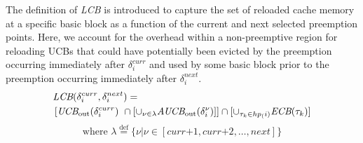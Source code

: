 The definition of \textit{LCB} is introduced to capture the set of reloaded cache memory at a specific basic block as a function of the current and next selected preemption points.  Here, we account for the overhead within a non-preemptive region for reloading UCBs that could have potentially been evicted by the preemption occurring immediately after $\delta_i^{curr}$ and used by some basic block prior to the preemption occurring immediately after $\delta_i^{next}$.
\begin{equation}\label{eqn:lcb-formula-1}
\begin{split}
    \lefteqn{\textit{LCB}(\delta_{i}^{curr},\delta_{i}^{next}) =} & \\
    &\left[\textit{UCB}_{\textrm{out}}(\delta_{i}^{curr})\ \cap \left[\cup_{\nu \in \lambda} \textit{AUCB}_{\textrm{out}}(\delta_{i}^{\nu})\right]\right] \cap [\cup_{\tau_{k}\in hp_(i)} \textit{ECB}(\tau_{k})]\\
\end{split}
\end{equation}
%
\begin{equation*}\label{eqn:lcb-formula-1b}
    \textrm{where }\lambda \stackrel{\text{def}}{=} \{ \nu|\nu \in [ \textit{curr+1}, \textit{curr+2}, \ldots, \textit{next} ] \}
\end{equation*}
%
\noindent
